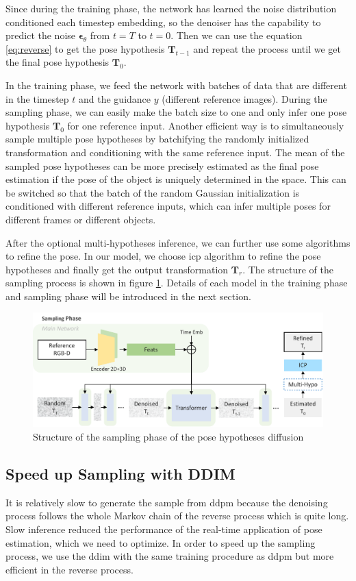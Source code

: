 \documentclass[12pt,DIV14,BCOR12mm,a4paper,footinclude=false,headinclude,parskip=half-,twoside,openright,cleardoublepage=empty,toc=index,bibliography=totoc,listof=totoc]{scrreprt}
\numberwithin{equation}{chapter}
\begin{document}
Since during the training phase, the network has learned the noise distribution conditioned each timestep embedding, so the denoiser has the capability to predict the noise $\boldsymbol{\epsilon}_{\theta}$ from $t=T$ to $t=0$. Then we can use the equation \ref{eq:reverse} to get the pose hypothesis $\mathbf{T}_{t-1}$ and repeat the process until we get the final pose hypothesis $\mathbf{T}_{0}$. 

In the training phase, we feed the network with batches of data that are different in the timestep $t$ and the guidance $y$ (different reference images). During the sampling phase, we can easily make the batch size to one and only infer one pose hypothesis $\mathbf{T}_{0}$ for one reference input. Another efficient way is to simultaneously sample multiple pose hypotheses by batchifying the randomly initialized transformation and conditioning with the same reference input. The mean of the sampled pose hypotheses can be more precisely estimated as the final pose estimation if the pose of the object is uniquely determined in the space. This can be switched so that the batch of the random Gaussian initialization is conditioned with different reference inputs, which can infer multiple poses for different frames or different objects.

After the optional multi-hypotheses inference, we can further use some algorithms to refine the pose. In our model, we choose \gls{icp}\cite{121791} algorithm to refine the pose hypotheses and finally get the output transformation $\mathbf{T}_{r}$. The structure of the sampling process is shown in figure \ref{img:sample}. Details of each model in the training phase and sampling phase will be introduced in the next section.
\begin{figure}[h]
	\centering
	\includegraphics[width=1.0\textwidth]{img/sample.pdf}
	\caption{Structure of the sampling phase of the pose hypotheses diffusion}
	\label{img:sample}
\end{figure}

\subsection{Speed up Sampling with DDIM}
It is relatively slow to generate the sample from \gls{ddpm} because the denoising process follows the whole Markov chain of the reverse process which is quite long. Slow inference reduced the performance of the real-time application of pose estimation, which we need to optimize. In order to speed up the sampling process, we use the \gls{ddim} \cite{song2022denoising} with the same training procedure as \gls{ddpm} but more efficient in the reverse process.
\end{document}
